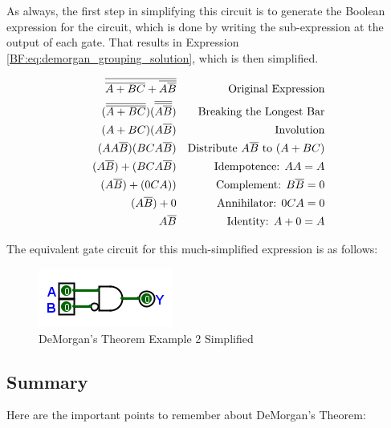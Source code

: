 As always, the first step in simplifying this circuit is to generate the Boolean expression for the circuit, which is done by writing the sub-expression at the output of each gate. That results in Expression \ref{BF:eq:demorgan_grouping_solution}, which is then simplified. 

\begin{align}
  \label{BF:eq:demorgan_grouping_solution}
  \overline{ \overline{A+BC} + \overline{A \overline{B}}} && \text{Original Expression} \\
  \nonumber
  ( \overline{\overline{A+BC}} ) ( \overline{\overline{A\overline{B}}} ) && \text{Breaking the Longest Bar} \\
  \nonumber
  (A+BC)(A\overline{B}) && \text{Involution} \\
  \nonumber
  (AA\overline{B}) (BCA\overline{B}) && \text{Distribute $ A\overline{B} $ to $ (A+BC) $} \\
  \nonumber
  (A\overline{B})+(BCA\overline{B}) && \text{Idempotence: $ AA=A $} \\
  \nonumber
  (A\overline{B})+(0CA)) && \text{Complement: $ B\overline{B}=0 $} \\
  \nonumber
  (A\overline{B})+0 && \text{Annihilator: $ 0CA=0 $} \\
  \nonumber
  A\overline{B} && \text{Identity: $ A+0=A $}
\end{align}

The equivalent gate circuit for this much-simplified expression is as follows:

\begin{figure}[H]
	\centering
	\includegraphics[width=\maxwidth{.95\linewidth}]{gfx/04_31}
	\caption{DeMorgan's Theorem Example 2 Simplified}
	\label{fig:04_31}
\end{figure}

\subsection{Summary}
\label{BF:subsec:demorgans_summary}

Here are the important points to remember about DeMorgan's Theorem: 

